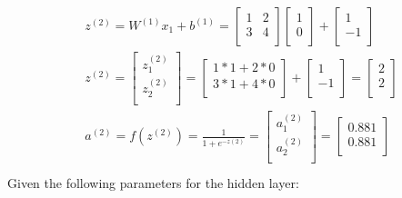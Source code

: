 \documentclass[leqno]{article}
\begin{document}
\begin{gather*}
\begin{split}
&z^{(2)} = W^{(1)}x_1 + b^{(1)} =
  \begin{bmatrix}
  1 & 2\\
  3 & 4\\ 
  \end{bmatrix}
  \begin{bmatrix}
  1\\
  0\\ 
  \end{bmatrix}
  +
 \begin{bmatrix}
  1\\
  -1\\ 
  \end{bmatrix}
\\
&z^{(2)} = 
\begin{bmatrix}
  z_1^{(2)}\\
  z_2^{(2)}\\ 
  \end{bmatrix}
  =
  \begin{bmatrix}
  1*1 + 2*0\\
  3*1 + 4*0\\ 
  \end{bmatrix}
  +
 \begin{bmatrix}
  1\\
  -1\\ 
  \end{bmatrix}
=
 \begin{bmatrix}
  2\\
  2\\ 
  \end{bmatrix}
\\
&a^{(2)} = f(z^{(2)}) = \frac{1}{1 + e^{-z{(2)}}} =
\begin{bmatrix}
   a_1^{(2)}\\
   a_2^{(2)}\\ 
  \end{bmatrix}
 =
 \begin{bmatrix}
   0.881\\
   0.881\\ 
  \end{bmatrix}
\\
\end{split}
\end{gather*}
Given the following parameters for the hidden layer:
\end{document}
